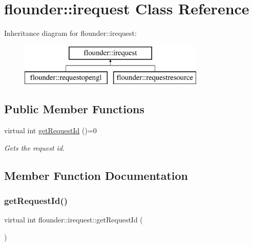 \hypertarget{classflounder_1_1irequest}{}\section{flounder\+:\+:irequest Class Reference}
\label{classflounder_1_1irequest}
Inheritance diagram for flounder\+:\+:irequest\+:\begin{figure}[H]
\begin{center}
\leavevmode
\includegraphics[height=2.000000cm]{classflounder_1_1irequest}
\end{center}
\end{figure}
\subsection*{Public Member Functions}
\begin{DoxyCompactItemize}
\item 
virtual int \hyperlink{classflounder_1_1irequest_a69e6b820c6635486e488e6aa18b11730}{get\+Request\+Id} ()=0
\begin{DoxyCompactList}\small\item\em Gets the request id. \end{DoxyCompactList}\end{DoxyCompactItemize}


\subsection{Member Function Documentation}
\mbox{\label{classflounder_1_1irequest_a69e6b820c6635486e488e6aa18b11730}} 
\subsubsection{\texorpdfstring{get\+Request\+Id()}{getRequestId()}}
{\footnotesize\ttfamily virtual int flounder\+::irequest\+::get\+Request\+Id (\begin{DoxyParamCaption}{ }\end{DoxyParamCaption})\hspace{0.3cm}{\ttfamily [pure virtual]}}



